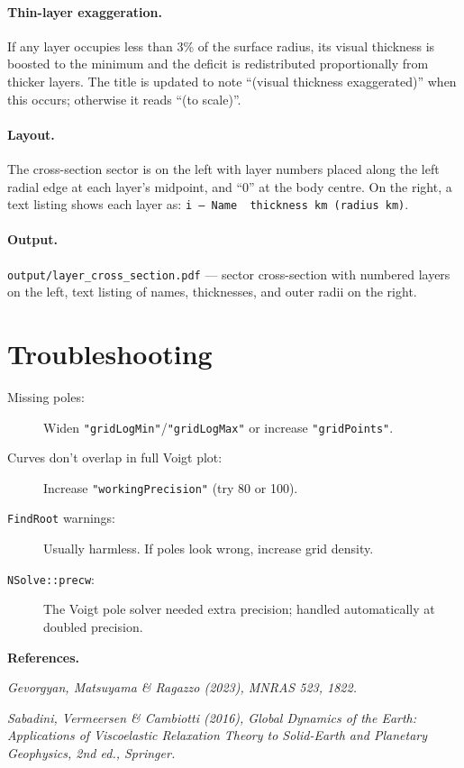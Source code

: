 \documentclass[11pt]{article}
\begin{document}
\paragraph{Thin-layer exaggeration.}
If any layer occupies less than 3\% of the surface radius, its visual
thickness is boosted to the minimum and the deficit is redistributed
proportionally from thicker layers.  The title is updated to note
``(visual thickness exaggerated)'' when this occurs; otherwise it reads
``(to scale)''.

\paragraph{Layout.}
The cross-section sector is on the left with layer numbers placed along
the left radial edge at each layer's midpoint, and ``0'' at the body
centre.  On the right, a text listing shows each layer as:
\texttt{i --- Name~~thickness~km (radius~km)}.

\paragraph{Output.}
\texttt{output/layer\_cross\_section.pdf} --- sector cross-section with
numbered layers on the left, text listing of names, thicknesses, and
outer radii on the right.

\section{Troubleshooting}
\label{sec:trouble}

\begin{description}
  \item[Missing poles:] Widen \texttt{"gridLogMin"}/\texttt{"gridLogMax"}
    or increase \texttt{"gridPoints"}.
  \item[Curves don't overlap in full Voigt plot:] Increase
    \texttt{"workingPrecision"} (try 80 or 100).
  \item[\texttt{FindRoot} warnings:] Usually harmless.  If poles look
    wrong, increase grid density.
  \item[\texttt{NSolve::precw}:] The Voigt pole solver needed extra
    precision; handled automatically at doubled precision.
\end{description}

\bigskip
\noindent\textbf{References.}

\medskip
\noindent
\textit{Gevorgyan, Matsuyama \& Ragazzo (2023), MNRAS 523, 1822.}

\medskip
\noindent
\textit{Sabadini, Vermeersen \& Cambiotti (2016), Global Dynamics of
the Earth: Applications of Viscoelastic Relaxation Theory to
Solid-Earth and Planetary Geophysics, 2nd ed., Springer.}
\end{document}
